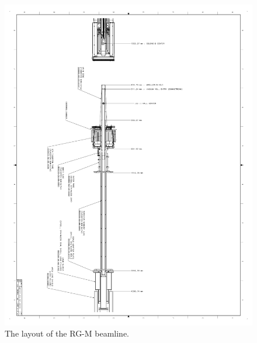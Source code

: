 \documentclass[12pt]{article}
\begin{document}
\begin{figure}[hbt]
\vspace{-2cm}
\begin{center}
\includegraphics[width=6in]{rgm_beam_page3.pdf}
\end{center}
\caption{ \label{fig:beamline3} 
The layout of the RG-M beamline. }
\end{figure}
\end{document}
